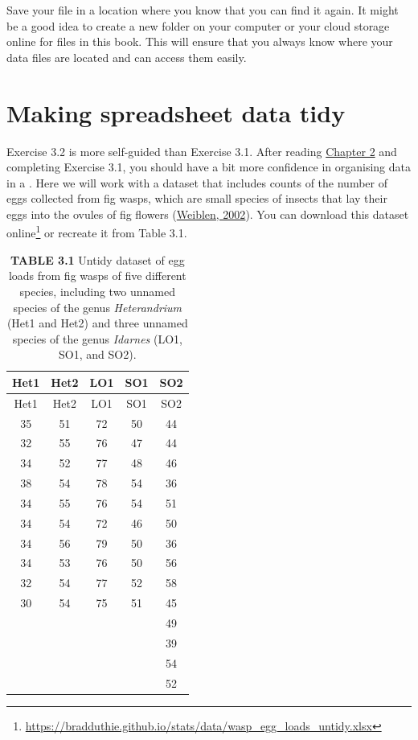 \documentclass[
  openany]{krantz}
\begin{document}
Save your file in a location where you know that you can find it again.
It might be a good idea to create a new folder on your computer or your cloud storage online for files in this book.
This will ensure that you always know where your data files are located and can access them easily.

\hypertarget{making-spreadsheet-data-tidy}{%
\section{Making spreadsheet data tidy}\label{making-spreadsheet-data-tidy}}

Exercise 3.2 is more self-guided than Exercise 3.1.
After reading \protect\hyperlink{Chapter_2}{Chapter 2} and completing Exercise 3.1, you should have a bit more confidence in organising data in a .
Here we will work with a dataset that includes counts of the number of eggs collected from fig wasps, which are small species of insects that lay their eggs into the ovules of fig flowers (\protect\hyperlink{ref-Weiblen2002}{Weiblen, 2002}).
You can download this dataset online\footnote{\url{https://bradduthie.github.io/stats/data/wasp_egg_loads_untidy.xlsx}} or recreate it from Table 3.1.

\newpage

\begin{longtable}[]{@{}ccccc@{}}
\caption{\textbf{TABLE 3.1} Untidy dataset of egg loads from fig wasps of five different species, including two unnamed species of the genus \emph{Heterandrium} (Het1 and Het2) and three unnamed species of the genus \emph{Idarnes} (LO1, SO1, and SO2).}\tabularnewline
\toprule
Het1 & Het2 & LO1 & SO1 & SO2 \\
\midrule
\endfirsthead
\toprule
Het1 & Het2 & LO1 & SO1 & SO2 \\
\midrule
\endhead
35 & 51 & 72 & 50 & 44 \\
32 & 55 & 76 & 47 & 44 \\
34 & 52 & 77 & 48 & 46 \\
38 & 54 & 78 & 54 & 36 \\
34 & 55 & 76 & 54 & 51 \\
34 & 54 & 72 & 46 & 50 \\
34 & 56 & 79 & 50 & 36 \\
34 & 53 & 76 & 50 & 56 \\
32 & 54 & 77 & 52 & 58 \\
30 & 54 & 75 & 51 & 45 \\
& & & & 49 \\
& & & & 39 \\
& & & & 54 \\
& & & & 52 \\
\bottomrule
\end{longtable}
\end{document}
